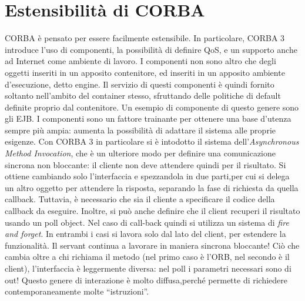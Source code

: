 \section{Estensibilità di CORBA}
CORBA è pensato per essere facilmente estensibile. In particolare, CORBA 3 introduce l'uso di componenti, la possibilità
di definire QoS, e un supporto anche ad Internet come ambiente di lavoro.
I componenti non sono altro che degli oggetti inseriti in un apposito contenitore, ed inseriti in un apposito ambiente
d'esecuzione, detto engine. Il servizio di questi componenti è quindi fornito soltanto nell'ambito del container stesso,
sfruttando delle politiche di default definite proprio dal contenitore. Un esempio di componente di questo genere sono
gli EJB.
I componenti sono un fattore trainante per ottenere una base d'utenza sempre più ampia: aumenta la possibilità di
adattare il sistema alle proprie esigenze.
Con CORBA 3 in particolare si è intodotto il sistema dell'\textit{Asynchronous Method Invocation}, che è un ulteriore
modo per definire una comunicazione sincrona non bloccante: il cliente non deve attendere quindi per il risultato.
Si ottiene cambiando solo l'interfaccia e spezzandola in due parti,per cui si delega un altro oggetto per attendere la risposta, separando la fase
di richiesta da quella callback. Tuttavia, è necessario che sia il cliente a specificare il codice della callback da
eseguire.
Inoltre, si può anche definire che il client recuperi il risultato usando un poll object. Nel caso di call-back quindi
si utilizza un sistema di \textit{fire and forget}. In entrambi i casi si lavora solo dal lato del client, per estendere
la funzionalità.
Il servant continua a lavorare in maniera sincrona bloccante! Ciò che cambia oltre a chi richiama il metodo (nel primo
caso è l'ORB, nel secondo è il client), l'interfaccia è leggermente diversa: nel poll i parametri necessari sono di out!
Questo genere di interazione è molto diffusa,perché permette di richiedere contemporaneamente molte ``istruzioni''.
